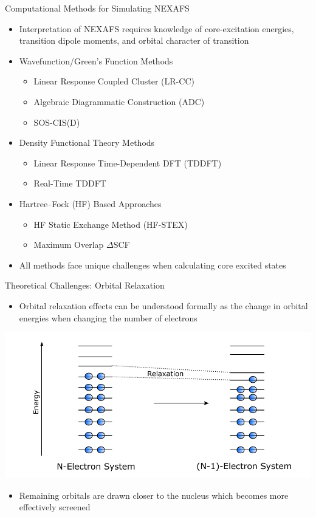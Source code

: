 \documentclass[t]{beamer}
\begin{document}
\begin{frame}{Computational Methods for Simulating NEXAFS}
\begin{itemize}
\item Interpretation of NEXAFS requires knowledge of core-excitation energies, transition dipole moments, and orbital character of transition
\item Wavefunction/Green's Function Methods
		\begin{itemize}
		\item Linear Response Coupled Cluster (LR-CC)
		\item Algebraic Diagrammatic Construction (ADC)
		\item SOS-CIS(D)
		\end{itemize}
\item Density Functional Theory Methods
		\begin{itemize}
		\item Linear Response Time-Dependent DFT (TDDFT)
		\item Real-Time TDDFT
		\end{itemize}
\item Hartree--Fock (HF) Based Approaches
		\begin{itemize}
		\item HF Static Exchange Method (HF-STEX)
		\item Maximum Overlap $\Delta$SCF
		\end{itemize}
\item All methods face unique challenges when calculating core excited states
\end{itemize}
\end{frame}

\begin{frame}{Theoretical Challenges: Orbital Relaxation}
\begin{itemize}
\item Orbital relaxation effects can be understood formally as the change in orbital energies when changing the number of electrons
\end{itemize}
\centering
\includegraphics[width=0.8\linewidth]{orbital_relaxation_diagram.pdf}
\begin{itemize}
\item Remaining orbitals are drawn closer to the nucleus which becomes more effectively screened
\end{itemize}
\end{frame}
\end{document}
